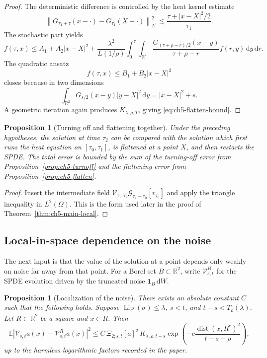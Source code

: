 \documentclass[11pt]{article}
\newtheorem{proposition}[theorem]{Proposition}
\theoremstyle{definition}
\theoremstyle{remark}
\newcommand{\R}{\mathbb{R}}
\newcommand{\E}{\mathbb{E}}
\newcommand{\Lip}{\operatorname{Lip}}
\newcommand{\dd}{\,\mathrm{d}}
\newcommand{\norm}[1]{\left\lVert #1\right\rVert}
\newcommand{\abs}[1]{\left\lvert #1\right\rvert}
\newcommand{\hsemig}[2]{\mathcal{G}_{#1}\left[{#2}\right]}
\newcommand{\V}{\mathcal{V}}
\begin{document}
\begin{proof}
The deterministic difference is controlled by the heat kernel estimate
\[
\norm{G_{\tau_1+\tau}(x-\cdot)-G_{\tau_1}(X-\cdot)}_{L^1}^2
\lesssim \frac{\tau+|x-X|^2/2}{\tau_1}.
\]
The stochastic part yields
\[
f(\tau,x)
\le A_1+A_2|x-X|^2
+\frac{\lambda^2}{L(1/\rho)}
\int_0^\tau\int_{\R^2}
\frac{G_{(\tau+\rho-r)/2}(x-y)}{\tau+\rho-r}f(r,y)\dd y\dd r.
\]
The quadratic ansatz
\[
f(\tau,x)\le B_1+B_2|x-X|^2
\]
closes because in two dimensions
\begin{equation}\label{eq:ch5-quadratic-heat}
\int_{\R^2}G_{s/2}(x-y)|y-X|^2\dd y
=|x-X|^2+s.
\end{equation}
A geometric iteration again produces \(K_{\lambda,\rho,T}\), giving \eqref{eq:ch5-flatten-bound}.
\end{proof}

\begin{proposition}[Turning off and flattening together]\label{prop:ch5-combined}
Under the preceding hypotheses, the solution at time \(\tau_2\) can be compared with the solution which first runs the heat equation on \([\tau_0,\tau_1]\), is flattened at a point \(X\), and then restarts the SPDE. The total error is bounded by the sum of the turning-off error from Proposition~\ref{prop:ch5-turnoff} and the flattening error from Proposition~\ref{prop:ch5-flatten}.
\end{proposition}

\begin{proof}
Insert the intermediate field
\(
\V_{\tau_1,\tau_2}\hsemig{\tau_1-\tau_0}{v_{\tau_0}}
\)
and apply the triangle inequality in \(L^2(\Omega)\). This is the form used later in the proof of Theorem~\ref{thm:ch5-main-local}.
\end{proof}

\subsection{Local-in-space dependence on the noise}

The next input is that the value of the solution at a point depends only weakly on noise far away from that point. For a Borel set \(B\subset\R^2\), write \(\V^{B}_{s,t}\) for the SPDE evolution driven by the truncated noise \(\mathbf{1}_B\dd W\).

\begin{proposition}[Localization of the noise]\label{prop:ch5-localnoise}
There exists an absolute constant \(C\) such that the following holds. Suppose \(\Lip(\sigma)\le\lambda\), \(s<t\), and \(t-s<\overline T_{\rho}(\lambda)\). Let \(R\subset\R^2\) be a square and \(x\in R\). Then
\begin{equation}\label{eq:ch5-localnoise-bound}
\E\abs{\V_{s,t}a(x)-\V^R_{s,t}a(x)}^2
\le
C\,\Xi_{2;s,t}[a]^2\,
K_{\lambda,\rho,t-s}
\exp\!\left(-c\frac{\operatorname{dist}(x,R^c)^2}{t-s+\rho}\right),
\end{equation}
up to the harmless logarithmic factors recorded in the paper.
\end{proposition}
\end{document}
